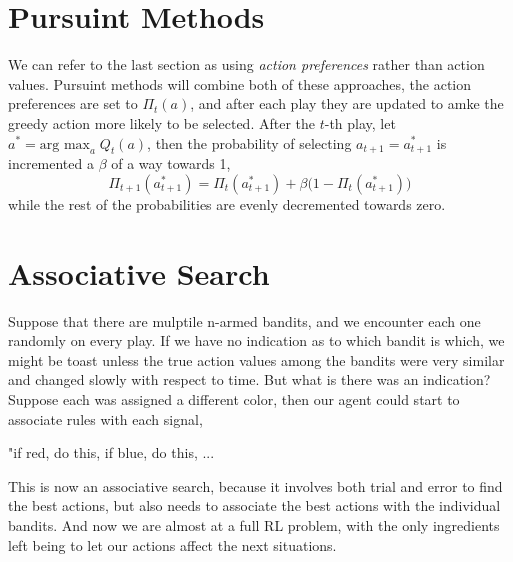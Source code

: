 \documentclass[11pt]{article}
\theoremstyle{definition}
\begin{document}
\section*{\textcolor{CalPolyGreen}{Pursuint Methods}}

We can refer to the last section as using \textit{action preferences} rather than action values.  Pursuint methods will combine both of these approaches, the action preferences are set to $\Pi_t(a)$, and after each play they are updated to amke the greedy action more likely to be selected.  After the $t$-th play, let $a^* = \text{arg max}_a\;Q_{t}(a)$, then the probability of selecting $a_{t+1} = a^*_{t+1}$ is incremented a $\beta$ of a way towards 1,
\[
    \Pi_{t+1}(a^*_{t+1}) = \Pi_t(a^*_{t+1}) + \beta\Big(1 - \Pi_t(a^*_{t+1})\Big)
\]
while the rest of the probabilities are evenly decremented towards zero.

\section*{\textcolor{CalPolyGreen}{Associative Search}}

Suppose that there are mulptile n-armed bandits, and we encounter each one randomly on every play.  If we have no indication as to which bandit is which, we might be toast unless the true action values among the bandits were very similar and changed slowly with respect to time.  But what is there was an indication?  Suppose each was assigned a different color, then our agent could start to associate rules with each signal,
\begin{center}
"if red, do this, if blue, do this, ...
\end{center}

This is now an associative search, because it involves both trial and error to find the best actions, but also needs to associate the best actions with the individual bandits.  And now we are almost at a full RL problem, with the only ingredients left being to let our actions affect the next situations.
\end{document}
